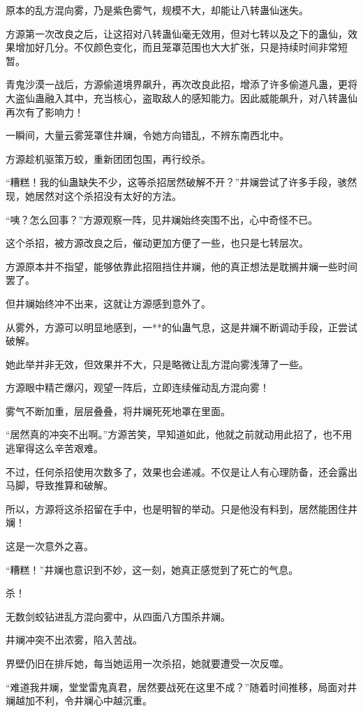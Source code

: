 \begin{this_body}
原本的乱方混向雾，乃是紫色雾气，规模不大，却能让八转蛊仙迷失。

方源第一次改良之后，让这招对八转蛊仙毫无效用，但对七转以及之下的蛊仙，效果增加好几分。不仅颜色变化，而且笼罩范围也大大扩张，只是持续时间非常短暂。

青鬼沙漠一战后，方源偷道境界飙升，再次改良此招，增添了许多偷道凡蛊，更将大盗仙蛊融入其中，充当核心，盗取敌人的感知能力。因此威能飙升，对八转蛊仙再次有了影响力！

一瞬间，大量云雾笼罩住井斓，令她方向错乱，不辨东南西北中。

方源趁机驱策万蛟，重新团团包围，再行绞杀。

“糟糕！我的仙蛊缺失不少，这等杀招居然破解不开？”井斓尝试了许多手段，骇然现，她居然对这个杀招没有太好的方法。

“咦？怎么回事？”方源观察一阵，见井斓始终突围不出，心中奇怪不已。

这个杀招，被方源改良之后，催动更加方便了一些，也只是七转层次。

方源原本并不指望，能够依靠此招阻挡住井斓，他的真正想法是耽搁井斓一些时间罢了。

但井斓始终冲不出来，这就让方源感到意外了。

从雾外，方源可以明显地感到，一**的仙蛊气息，这是井斓不断调动手段，正尝试破解。

她此举并非无效，但效果并不大，只是略微让乱方混向雾浅薄了一些。

方源眼中精芒爆闪，观望一阵后，立即连续催动乱方混向雾！

雾气不断加重，层层叠叠，将井斓死死地罩在里面。

“居然真的冲突不出啊。”方源苦笑，早知道如此，他就之前就动用此招了，也不用逃窜得这么辛苦艰难。

不过，任何杀招使用次数多了，效果也会递减。不仅是让人有心理防备，还会露出马脚，导致推算和破解。

所以，方源将这杀招留在手中，也是明智的举动。只是他没有料到，居然能困住井斓！

这是一次意外之喜。

“糟糕！”井斓也意识到不妙，这一刻，她真正感觉到了死亡的气息。

杀！

无数剑蛟钻进乱方混向雾中，从四面八方围杀井斓。

井斓冲突不出浓雾，陷入苦战。

界壁仍旧在排斥她，每当她运用一次杀招，她就要遭受一次反噬。

“难道我井斓，堂堂雷鬼真君，居然要战死在这里不成？”随着时间推移，局面对井斓越加不利，令井斓心中越沉重。


\end{this_body}

